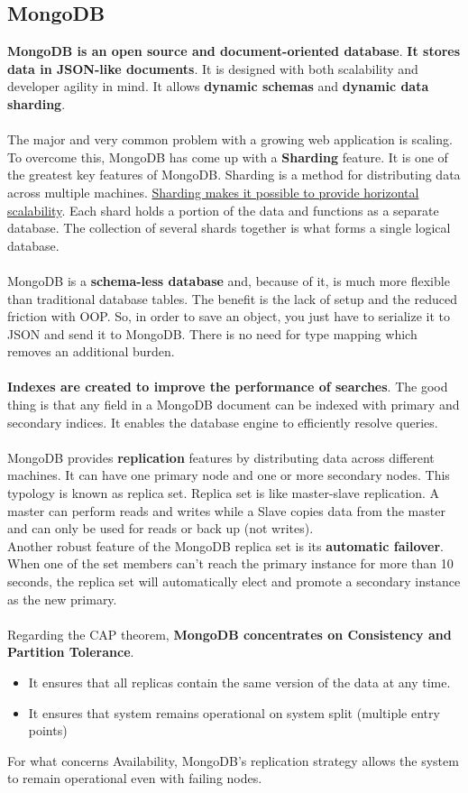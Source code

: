 \documentclass[10pt,a4paper]{article}
\newcommand{\nline}{\\~\\}
\begin{document}
\subsection{MongoDB}
\textbf{MongoDB is an open source and document-oriented database}. \textbf{It stores data in JSON-like documents}. It is designed with both scalability and developer agility in mind. It allows \textbf{dynamic schemas} and \textbf{dynamic data sharding}.
\nline
The major and very common problem with a growing web application is scaling. To overcome this, MongoDB has come up with a \textbf{Sharding} feature. It is one of the greatest key features of MongoDB. Sharding is a method for distributing data across multiple machines.
\uline{Sharding makes it possible to provide horizontal scalability}. Each shard holds a portion of the data and functions as a separate database. The collection of several shards together is what forms a single logical database.
\nline
MongoDB is a \textbf{schema-less database} and, because of it, is much more flexible than traditional database tables. The benefit is the lack of setup and the reduced friction with OOP. So, in order to save an object, you just have to serialize it to JSON and send it to MongoDB. There is no need for type mapping which removes an additional burden.
\nline
\textbf{Indexes are created to improve the performance of searches}. The good thing is that any field in a MongoDB document can be indexed with primary and secondary indices. It enables the database engine to efficiently resolve queries.
\nline
MongoDB provides \textbf{replication} features by distributing data across different machines. It can have one primary node and one or more secondary nodes. This typology is known as replica set. Replica set is like master-slave replication. A master can perform reads and writes while a Slave copies data from the master and can only be used for reads or back up (not writes). \\ Another robust feature of the MongoDB replica set is its \textbf{automatic failover}.
When one of the set members can’t reach the primary instance for more than 10 seconds, the replica set will automatically elect and promote a secondary instance as the new primary.
\nline
Regarding the CAP theorem, \textbf{MongoDB concentrates on Consistency and Partition Tolerance}. 
\begin{itemize}
	\item It ensures that all replicas contain the same version of the data at any time.
	\item It ensures that system remains operational on system split (multiple entry points)
\end{itemize}
For what concerns Availability, MongoDB’s replication strategy allows the system to remain operational even with failing nodes.
\end{document}
